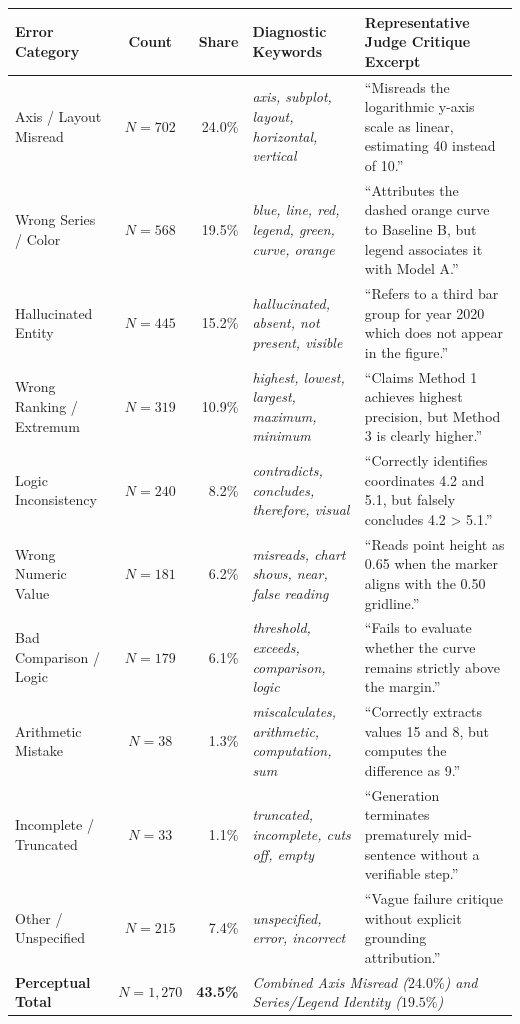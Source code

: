 \documentclass[11pt]{article}
\begin{document}
\begin{table}[t]
\centering
\footnotesize
\setlength{\tabcolsep}{3.5pt}
\begin{tabular}{lcr p{3.2cm} p{5.2cm}}
\toprule
\textbf{Error Category} & \textbf{Count} & \textbf{Share} & \textbf{Diagnostic Keywords} & \textbf{Representative Judge Critique Excerpt} \\
\midrule
Axis / Layout Misread & $N=702$ & 24.0\% & \textit{axis, subplot, layout, horizontal, vertical} & ``Misreads the logarithmic y-axis scale as linear, estimating 40 instead of 10.'' \\
Wrong Series / Color & $N=568$ & 19.5\% & \textit{blue, line, red, legend, green, curve, orange} & ``Attributes the dashed orange curve to Baseline B, but legend associates it with Model A.'' \\
Hallucinated Entity & $N=445$ & 15.2\% & \textit{hallucinated, absent, not present, visible} & ``Refers to a third bar group for year 2020 which does not appear in the figure.'' \\
Wrong Ranking / Extremum & $N=319$ & 10.9\% & \textit{highest, lowest, largest, maximum, minimum} & ``Claims Method 1 achieves highest precision, but Method 3 is clearly higher.'' \\
Logic Inconsistency & $N=240$ & 8.2\% & \textit{contradicts, concludes, therefore, visual} & ``Correctly identifies coordinates 4.2 and 5.1, but falsely concludes 4.2 > 5.1.'' \\
Wrong Numeric Value & $N=181$ & 6.2\% & \textit{misreads, chart shows, near, false reading} & ``Reads point height as 0.65 when the marker aligns with the 0.50 gridline.'' \\
Bad Comparison / Logic & $N=179$ & 6.1\% & \textit{threshold, exceeds, comparison, logic} & ``Fails to evaluate whether the curve remains strictly above the margin.'' \\
Arithmetic Mistake & $N=38$ & 1.3\% & \textit{miscalculates, arithmetic, computation, sum} & ``Correctly extracts values 15 and 8, but computes the difference as 9.'' \\
Incomplete / Truncated & $N=33$ & 1.1\% & \textit{truncated, incomplete, cuts off, empty} & ``Generation terminates prematurely mid-sentence without a verifiable step.'' \\
Other / Unspecified & $N=215$ & 7.4\% & \textit{unspecified, error, incorrect} & ``Vague failure critique without explicit grounding attribution.'' \\
\midrule
\textbf{Perceptual Total} & $N=1,270$ & \textbf{43.5\%} & \multicolumn{2}{l}{\textit{Combined Axis Misread ($24.0\%$) and Series/Legend Identity ($19.5\%$)}} \\

\end{tabular}
\end{table}
\end{document}
